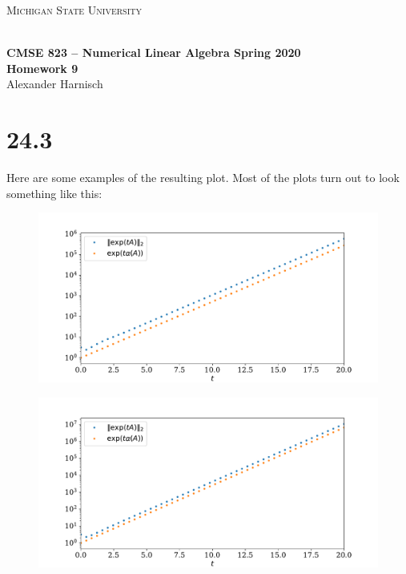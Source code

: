 \documentclass[a4paper, 11pt]{article}
\begin{document}
\noindent
\centerline{\small{\textsc{Michigan State University}}} \\
\large{\textbf{CMSE 823 – Numerical Linear Algebra \hfill Spring 2020 \\
Homework 9}} \\
Alexander Harnisch \\
\noindent\makebox[\linewidth]{\rule{\textwidth}{0.4pt}}

\section*{24.3}
Here are some examples of the resulting plot. Most of the plots turn out to look something like this:
\begin{figure}[H]
  \centering
  \includegraphics[width=\textwidth]{../24_3/straight_1.pdf}
\end{figure}
\begin{figure}[H]
  \centering
  \includegraphics[width=\textwidth]{../24_3/straight_2.pdf}
\end{figure}
\end{document}
